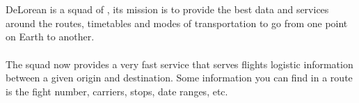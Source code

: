 
\section{\squad}

DeLorean\cite{delorean_squad_home} is a squad of \tribe, its mission is to provide the best data and services around the routes, timetables and modes of transportation to go from one point on Earth to another.
\\\\
The squad now provides a very fast service that serves flights logistic information between a given origin and destination. Some information you can find in a route is the fight number, carriers, stops, date ranges, etc.